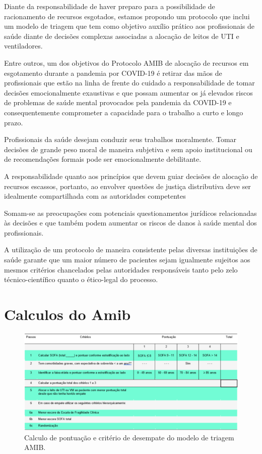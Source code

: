 \documentclass[12pt]{article}
\begin{document}
Diante da responsabilidade de haver preparo para a possibilidade de racionamento de recursos
esgotados, estamos propondo um protocolo que inclui um modelo de triagem que tem como objetivo auxílio prático aos profissionais de saúde diante de decisões complexas associadas a alocação de leitos de UTI e
ventiladores.


Entre outros, um dos objetivos do Protocolo AMIB de alocação de recursos em esgotamento durante a pandemia por COVID-19 é retirar das mãos de profissionais que estão na linha de frente do cuidado a responsabilidade de tomar decisões emocionalmente exaustivas e que possam aumentar os já elevados riscos de problemas de saúde mental provocados pela pandemia da COVID-19 e consequentemente comprometer a capacidade para o trabalho a curto e longo prazo.

Profissionais da saúde desejam conduzir seus trabalhos moralmente. Tomar decisões de grande peso moral de maneira subjetiva e sem apoio institucional ou de recomendações formais pode ser emocionalmente debilitante.

A responsabilidade quanto aos princípios que devem guiar decisões de alocação de recursos escassos, portanto, ao envolver questões de justiça distributiva deve ser idealmente compartilhada com as autoridades competentes

Somam-se as preocupações com potenciais questionamentos jurídicos relacionadas às decisões e que também podem aumentar os riscos de danos à saúde mental dos profissionais.

A utilização de um protocolo de maneira consistente pelas diversas instituições de saúde garante que um maior número de pacientes sejam igualmente sujeitos aos mesmos critérios chancelados pelas autoridades responsáveis tanto pelo zelo técnico-científico quanto o ético-legal do processo.

\section{Calculos do Amib }

\begin{figure}[!htb]
    \centering
    \includegraphics[scale=0.9]{img/Tabela de pontuacoes e criterios.png}
    \centering
    \caption{Calculo de pontuação e critério de desempate do modelo de triagem AMIB.}
    \label{subexpressao}
\end{figure}
\end{document}
